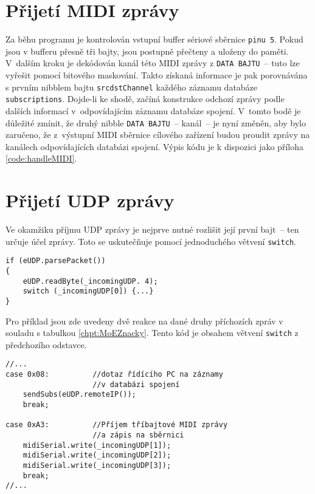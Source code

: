 \section{Přijetí \acs{MIDI} zprávy}\label{chpt:PrijMIDI}
Za běhu programu je kontrolován vstupní buffer sériové sběrnice \texttt{pinu~5}. Pokud jsou v bufferu přesně tři bajty, jsou postupně přečteny a uloženy do paměti. V~dalším kroku je dekódován kanál této \acs{MIDI} zprávy z \texttt{DATA BAJTU}~-- tuto  lze vyřešit pomocí bitového maskování. Takto získaná informace je pak porovnávána s prvním nibblem bajtu \texttt{srcdstChannel} každého záznamu databáze \texttt{sub\-scrip\-tions}. Dojde-li ke shodě, začíná konstrukce odchozí zprávy podle dalších informací v~odpovídajícím záznamu databáze spojení. V~tomto bodě je důležité zmínit, že druhý nibble \texttt{DATA BAJTU}~-- kanál~-- je nyní změněn, aby bylo zaručeno, že z~výstupní \acs{MIDI} sběrnice cílového zařízení budou proudit zprávy na kanálech odpovídajících databázi spojení. Výpis kódu je k dispozici jako příloha \ref{code:handleMIDI}.

\section{Přijetí UDP zprávy}
Ve okamžiku příjmu \acs{UDP} zprávy je nejprve nutné rozlišit její první bajt~-- ten určuje účel zprávy. Toto se uskutečňuje pomocí jednoduchého větvení \texttt{switch}.
\begin{lstlisting}
if (eUDP.parsePacket())
{
    eUDP.readByte(_incomingUDP. 4);
    switch (_incomingUDP[0]) {...}
}
\end{lstlisting}

Pro příklad jsou zde uvedeny dvě reakce na dané druhy příchozích zpráv v souladu s tabulkou \ref{chpt:MoEZnacky}. Tento kód je obsahem větvení \texttt{switch} z předchozího odstavce.
\begin{lstlisting}
//...
case 0x08:          //dotaz řídícího PC na záznamy 
                    //v databázi spojení
    sendSubs(eUDP.remoteIP());
    break;

case 0xA3:          //Příjem tříbajtové MIDI zprávy 
                    //a zápis na sběrnici
    midiSerial.write(_incomingUDP[1]);
    midiSerial.write(_incomingUDP[2]);
    midiSerial.write(_incomingUDP[3]);
    break;
//...
\end{lstlisting}
